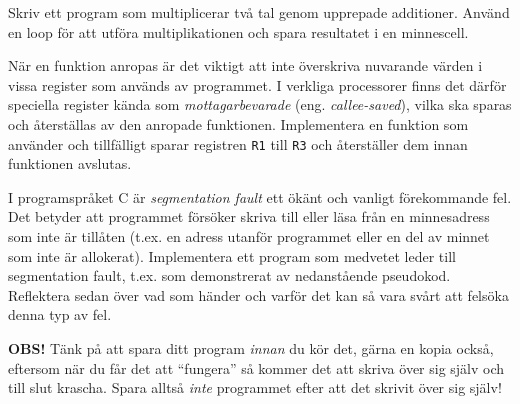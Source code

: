 \begin{Extrauppgifter}
\begin{enumerate}
\end{enumerate}

\item {} Skriv ett program som multiplicerar två tal genom upprepade additioner. Använd en loop för att utföra multiplikationen och spara resultatet i en minnescell.

\item {} När en funktion anropas är det viktigt att inte överskriva nuvarande värden i vissa register som används av programmet. I verkliga processorer finns det därför speciella register kända som \emph{mottagarbevarade} (eng. \emph{callee-saved}), vilka ska sparas och återställas av den anropade funktionen. Implementera en funktion som använder och tillfälligt sparar registren \texttt{R1} till \texttt{R3} och återställer dem innan funktionen avslutas.


\item {}
I programspråket C är \emph{segmentation fault} ett ökänt och vanligt förekommande fel. Det betyder att programmet försöker skriva till eller läsa från en minnesadress som inte är tillåten (t.ex. en adress utanför programmet eller en del av minnet som inte är allokerat).    
Implementera ett program som medvetet leder till segmentation fault, t.ex. som demonstrerat av nedanstående pseudokod. Reflektera sedan över vad som händer och varför det kan så vara svårt att felsöka denna typ av fel.

\halfblankline
\textbf{OBS!} Tänk på att spara ditt program \emph{innan} du kör det, gärna en kopia också, eftersom när du får det att \enquote{fungera} så kommer det att skriva över sig själv och till slut krascha. Spara alltså \emph{inte} programmet efter att det skrivit över sig själv!



\end{Extrauppgifter}
